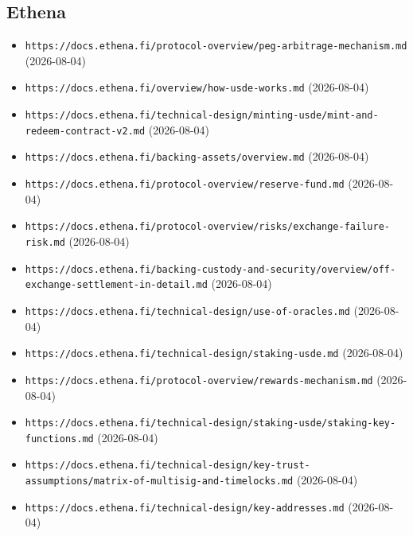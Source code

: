 \subsection*{Ethena}
\begin{itemize}\setlength{\itemsep}{0pt}\small
\item \texttt{https://docs.ethena.fi/protocol-overview/peg-arbitrage-mechanism.md} (2026-08-04)
\item \texttt{https://docs.ethena.fi/overview/how-usde-works.md} (2026-08-04)
\item \texttt{https://docs.ethena.fi/technical-design/minting-usde/mint-and-redeem-contract-v2.md} (2026-08-04)
\item \texttt{https://docs.ethena.fi/backing-assets/overview.md} (2026-08-04)
\item \texttt{https://docs.ethena.fi/protocol-overview/reserve-fund.md} (2026-08-04)
\item \texttt{https://docs.ethena.fi/protocol-overview/risks/exchange-failure-risk.md} (2026-08-04)
\item \texttt{https://docs.ethena.fi/backing-custody-and-security/overview/off-exchange-settlement-in-detail.md} (2026-08-04)
\item \texttt{https://docs.ethena.fi/technical-design/use-of-oracles.md} (2026-08-04)
\item \texttt{https://docs.ethena.fi/technical-design/staking-usde.md} (2026-08-04)
\item \texttt{https://docs.ethena.fi/protocol-overview/rewards-mechanism.md} (2026-08-04)
\item \texttt{https://docs.ethena.fi/technical-design/staking-usde/staking-key-functions.md} (2026-08-04)
\item \texttt{https://docs.ethena.fi/technical-design/key-trust-assumptions/matrix-of-multisig-and-timelocks.md} (2026-08-04)
\item \texttt{https://docs.ethena.fi/technical-design/key-addresses.md} (2026-08-04)
\end{itemize}

